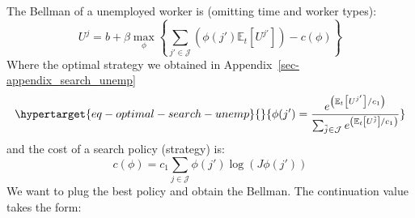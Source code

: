 \documentclass[
  letterpaper,
  DIV=11,
  numbers=noendperiod]{scrreprt}
\begin{document}
The Bellman of a unemployed worker is (omitting time and worker types):
\[U^{j} = b + \beta\max_{\phi}\left\{\sum_{j'\in \mathcal{J}} \left(\phi(j')\mathbb{E}_t\left[U^{j'} \right]\right) -c(\phi) \right\}\]
Where the optimal strategy we obtained in
Appendix~\ref{sec-appendix_search_unemp}
\begin{equation}\protect\hypertarget{eq-optimal-search-unemp}{}{\phi(j') = \frac{e^{\left(\mathbb{E}_t\left[U^{j'}\right] /c_1\right)}}{\sum_{\tilde{j}\in \mathcal{J}}e^{\left(\mathbb{E}_t\left[U^{\tilde{j}}\right] /c_1\right)}}}\label{eq-optimal-search-unemp}\end{equation}
and the cost of a search policy (strategy) is:
\[c(\phi) = c_{1} \sum_{j\in \mathcal{J}}\phi(j')\log(J \phi(j'))\] We
want to plug the best policy and obtain the Bellman. The continuation
value takes the form:
\end{document}
